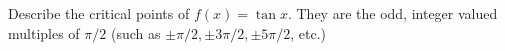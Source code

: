 {Describe the critical points of $f(x) = \tan x$.
}
{They are the odd, integer valued multiples of $\pi/2$ (such as $\pm\pi/2, \pm 3\pi/2, \pm5\pi/2$, etc.)
}
